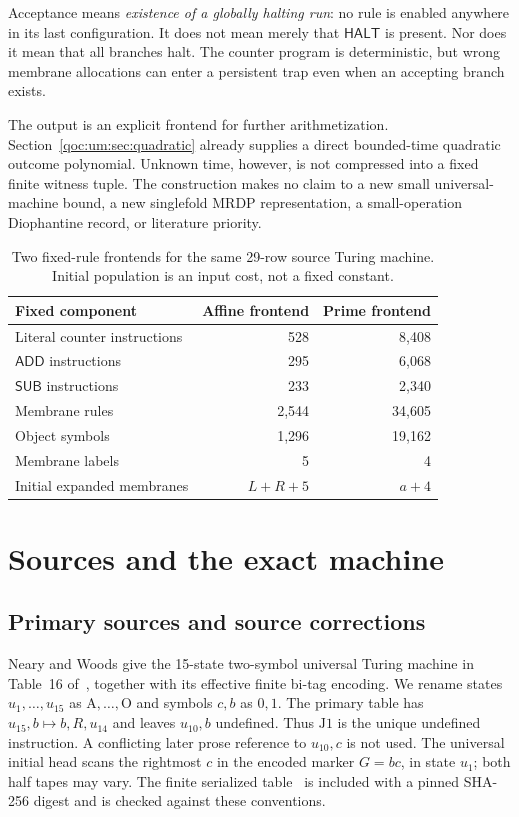 \documentclass[11pt,letterpaper]{article}
\theoremstyle{definition}
\theoremstyle{remark}
\newcommand{\HALT}{\mathsf{HALT}}
\newcommand{\ADD}{\mathsf{ADD}}
\newcommand{\SUB}{\mathsf{SUB}}
\begin{document}
Acceptance means \emph{existence of a globally halting run}: no rule is enabled anywhere in its last configuration. It does not mean merely that $\HALT$ is present. Nor does it mean that all branches halt. The counter program is deterministic, but wrong membrane allocations can enter a persistent trap even when an accepting branch exists.

The output is an explicit frontend for further arithmetization. Section~\ref{qoc:um:sec:quadratic} already supplies a direct bounded-time quadratic outcome polynomial. Unknown time, however, is not compressed into a fixed finite witness tuple. The construction makes no claim to a new small universal-machine bound, a new singlefold MRDP representation, a small-operation Diophantine record, or literature priority.

\begin{table}[ht]
\centering
\begin{tabular}{lrr}
\toprule
Fixed component & Affine frontend & Prime frontend\\\midrule
Literal counter instructions & 528 & 8,408\\
\quad $\ADD$ instructions & 295 & 6,068\\
\quad $\SUB$ instructions & 233 & 2,340\\
Membrane rules & 2,544 & 34,605\\
Object symbols & 1,296 & 19,162\\
Membrane labels & 5 & 4\\
Initial expanded membranes & $L+R+5$ & $a+4$\\
\bottomrule
\end{tabular}
\caption{Two fixed-rule frontends for the same 29-row source Turing machine. Initial population is an input cost, not a fixed constant.}\label{qoc:um:tab:ledger}
\end{table}

\section{Sources and the exact machine}\label{qoc:um:sec:sources}
\subsection{Primary sources and source corrections}
Neary and Woods give the 15-state two-symbol universal Turing machine in Table~16 of~\cite{um:NW}, together with its effective finite bi-tag encoding. We rename states $u_1,\ldots,u_{15}$ as $\mathrm A,\ldots,\mathrm O$ and symbols $c,b$ as $0,1$. The primary table has $u_{15},b\mapsto b,R,u_{14}$ and leaves $u_{10},b$ undefined. Thus $\mathrm{J}1$ is the unique undefined instruction. A conflicting later prose reference to $u_{10},c$ is not used. The universal initial head scans the rightmost $c$ in the encoded marker $G=bc$, in state $u_1$; both half tapes may vary. The finite serialized table~\cite{um:serialization} is included with a pinned SHA-256 digest and is checked against these conventions.
\end{document}
